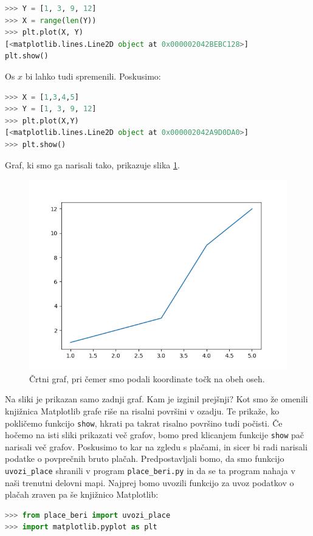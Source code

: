 \begin{lstlisting}[language=Python, showstringspaces=false]
>>> Y = [1, 3, 9, 12]
>>> X = range(len(Y))
>>> plt.plot(X, Y)
[<matplotlib.lines.Line2D object at 0x000002042BEBC128>]
plt.show()
\end{lstlisting}
Os $x$ bi lahko tudi spremenili. Poskusimo:
\begin{lstlisting}[language=Python, showstringspaces=false]
>>> X = [1,3,4,5]
>>> Y = [1, 3, 9, 12]
>>> plt.plot(X,Y)
[<matplotlib.lines.Line2D object at 0x000002042A9D0DA0>]
>>> plt.show()
\end{lstlisting}
Graf, ki smo ga narisali tako, prikazuje slika \ref{img:plt2}.
\begin{figure}
    \includegraphics[width=\linewidth]{img/plt2.png}
    \caption{Črtni graf, pri čemer smo podali koordinate točk na obeh oseh.}
    \label{img:plt2}
\end{figure}
Na sliki je prikazan samo zadnji graf. Kam je izginil prejšnji? Kot smo že omenili knjižnica Matplotlib grafe riše na risalni površini v ozadju. Te prikaže, ko pokličemo funkcijo \texttt{show}, hkrati pa takrat risalno površino tudi počisti. Če hočemo na isti sliki prikazati več grafov, bomo pred klicanjem funkcije \texttt{show} pač narisali več grafov. Poskusimo to kar na zgledu s plačami, in sicer bi radi narisali podatke o povprečnih bruto plačah. Predpostavljali bomo, da smo funkcijo \texttt{uvozi\_place} shranili v program \texttt{place\_beri.py} in da se ta program nahaja v naši trenutni delovni mapi. Najprej bomo uvozili funkcijo za uvoz podatkov o plačah zraven pa še knjižnico Matplotlib:
\begin{lstlisting}[language=Python, showstringspaces=false]
>>> from place_beri import uvozi_place
>>> import matplotlib.pyplot as plt
\end{lstlisting}
